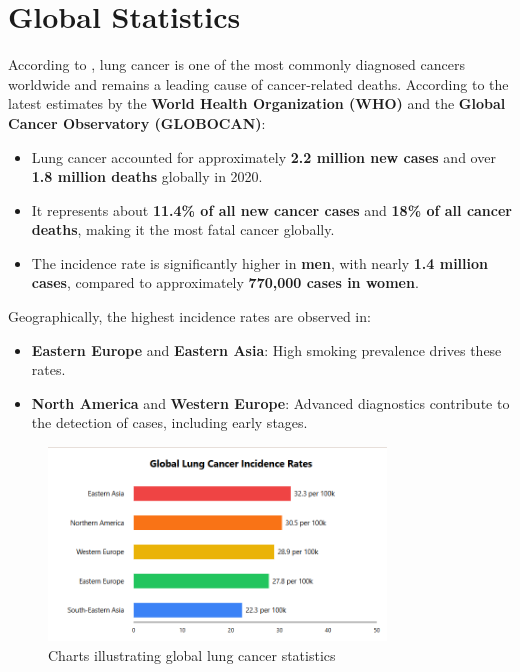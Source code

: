 \section{Global Statistics}
According to \cite{jemal2011global}, lung cancer is one of the most commonly diagnosed cancers worldwide and remains a leading cause of cancer-related deaths. According to the latest estimates by the \textbf{World Health Organization (WHO)} and the \textbf{Global Cancer Observatory (GLOBOCAN)}:
\begin{itemize}
    \item Lung cancer accounted for approximately \textbf{2.2 million new cases} and over \textbf{1.8 million deaths} globally in 2020.
    \item It represents about \textbf{11.4\% of all new cancer cases} and \textbf{18\% of all cancer deaths}, making it the most fatal cancer globally.
    \item The incidence rate is significantly higher in \textbf{men}, with nearly \textbf{1.4 million cases}, compared to approximately \textbf{770,000 cases in women}.
\end{itemize}

Geographically, the highest incidence rates are observed in:
\begin{itemize}
    \item \textbf{Eastern Europe} and \textbf{Eastern Asia}: High smoking prevalence drives these rates.
    \item \textbf{North America} and \textbf{Western Europe}: Advanced diagnostics contribute to the detection of cases, including early stages.
\end{itemize}
\begin{figure}[h!]
    \centering
    \includegraphics[width=0.8\textwidth]{images/lunc cancer global.png}
    \caption{Charts illustrating global lung cancer statistics}
    \label{fig:lung_stats}
\end{figure}
\newpage
